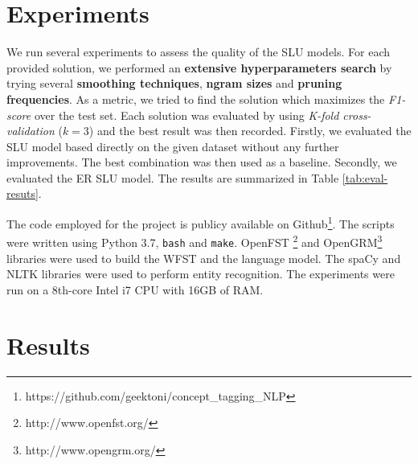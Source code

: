 \documentclass[11pt,a4paper]{article}
\begin{document}
\section{Experiments}

We run several experiments to assess the quality of 
the SLU models. For each provided solution, we performed an \textbf{extensive hyperparameters search} by trying several \textbf{smoothing techniques}, \textbf{ngram sizes} and \textbf{pruning frequencies}. As a metric, we tried to find the solution which maximizes the \textit{F1-score} over the test set. Each solution was evaluated by using \textit{K-fold cross-validation} ($k=3$) and the best result was then recorded. Firstly, we evaluated the SLU model based directly on the given dataset without any further improvements. The best combination was then used as a baseline. Secondly, we evaluated the ER SLU model. The results are summarized in Table \ref{tab:eval-resuts}.

The code employed for the project is publicy available on Github\footnote{https://github.com/geektoni/concept\_tagging\_NLP}. The scripts were written using Python 3.7, \texttt{bash} and \texttt{make}. OpenFST \footnote{http://www.openfst.org/} and OpenGRM\footnote{http://www.opengrm.org/} libraries were used to build the WFST and the language model. The spaCy and NLTK libraries were used to perform entity recognition.
The experiments were run on a 8th-core Intel i7 CPU with 16GB of RAM. 



\section{Results}
\end{document}
